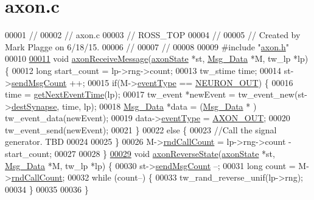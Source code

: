 \hypertarget{axon_8c_source}{}\section{axon.\+c}
\label{axon_8c_source}

\begin{DoxyCode}
00001 \textcolor{comment}{//}
00002 \textcolor{comment}{//  axon.c}
00003 \textcolor{comment}{//  ROSS\_TOP}
00004 \textcolor{comment}{//}
00005 \textcolor{comment}{//  Created by Mark Plagge on 6/18/15.}
00006 \textcolor{comment}{//}
00007 \textcolor{comment}{//}
00008 
00009 \textcolor{preprocessor}{#include "\hyperlink{axon_8h}{axon.h}"}
00010 
\hypertarget{axon_8c_source_l00011}{}\hyperlink{axon_8h_ab136d88cfbbb1e9f0f3687908dd54851}{00011} \textcolor{keywordtype}{void} \hyperlink{axon_8c_ab136d88cfbbb1e9f0f3687908dd54851}{axonReceiveMessage}(\hyperlink{structaxon_state}{axonState} *st, \hyperlink{struct_msg___data}{Msg\_Data} *M, tw\_lp *lp)\{
00012     \textcolor{keywordtype}{long} start\_count = lp->rng->count;
00013     tw\_stime time;
00014     st->\hyperlink{structaxon_state_a217ba44fb923dc4dc62bb73b14e61517}{sendMsgCount} ++;
00015     \textcolor{keywordflow}{if}(M->\hyperlink{struct_msg___data_a015b6eb45982e1842ee8fc389a099ced}{eventType} == \hyperlink{assist_8h_a7c1688de451e0dea1e11617bce3ec450a777cedd6ca25a5d7a84aab10a8735af0}{NEURON\_OUT}) \{
00016             time = \hyperlink{assist_8c_a30602b11dbfa6bcb90dc00e7942cfb02}{getNextEventTime}(lp);
00017             tw\_event *newEvent = tw\_event\_new(st->\hyperlink{structaxon_state_a665999819b255f36d756f17b85bc9a03}{destSynapse}, time, lp);
00018             \hyperlink{struct_msg___data}{Msg\_Data} *data = (\hyperlink{struct_msg___data}{Msg\_Data} * ) tw\_event\_data(newEvent);
00019             data->\hyperlink{struct_msg___data_a015b6eb45982e1842ee8fc389a099ced}{eventType} = \hyperlink{assist_8h_a7c1688de451e0dea1e11617bce3ec450abb8b28588ca2e1c33d29df003b3b90ee}{AXON\_OUT};
00020             tw\_event\_send(newEvent);
00021     \}
00022     \textcolor{keywordflow}{else} \{
00023             \textcolor{comment}{//Call the signal generator. TBD}
00024 
00025     \}
00026     M->\hyperlink{struct_msg___data_a2e49a6bcc6c45ade722f746b1ea707f2}{rndCallCount} = lp->rng->count - start\_count;
00027 
00028 \}
\hypertarget{axon_8c_source_l00029}{}\hyperlink{axon_8h_a4540abe1d7c57cae5b0ff088d3d47fd1}{00029} \textcolor{keywordtype}{void} \hyperlink{axon_8c_a4540abe1d7c57cae5b0ff088d3d47fd1}{axonReverseState}(\hyperlink{structaxon_state}{axonState} *st, \hyperlink{struct_msg___data}{Msg\_Data} *M, tw\_lp *lp) \{
00030     st->\hyperlink{structaxon_state_a217ba44fb923dc4dc62bb73b14e61517}{sendMsgCount} --;
00031     \textcolor{keywordtype}{long} count = M->\hyperlink{struct_msg___data_a2e49a6bcc6c45ade722f746b1ea707f2}{rndCallCount};
00032     \textcolor{keywordflow}{while} (count--) \{
00033         tw\_rand\_reverse\_unif(lp->rng);
00034     \}
00035 
00036 \}
\end{DoxyCode}
